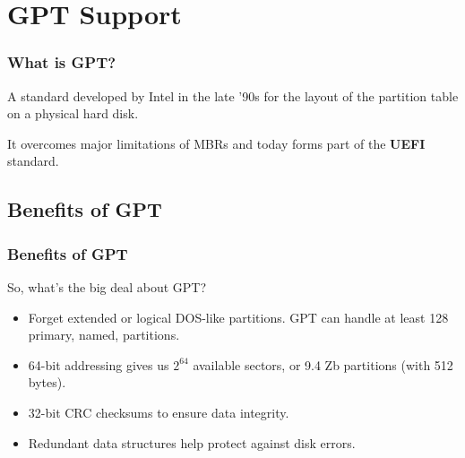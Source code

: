
\section{GPT Support}
\begin{frame}\frametitle{What is GPT?}
  A standard developed by Intel in the late '90s for the layout of the partition table on a physical hard disk.\newline

  It overcomes major limitations of MBRs and today forms part of the \textbf{UEFI} standard.
\end{frame}

\subsection{Benefits of GPT}
\begin{frame}\frametitle{Benefits of GPT}
  So, what's the big deal about GPT?
  \begin{itemize}
  \item Forget extended or logical DOS-like partitions. GPT can handle at least 128 primary, named, partitions.
  \item 64-bit addressing gives us $2^{64}$ available sectors, or 9.4 Zb partitions (with 512 bytes).
  \item 32-bit CRC checksums to ensure data integrity.
  \item Redundant data structures help protect against disk errors.
  \end{itemize}
\end{frame}

